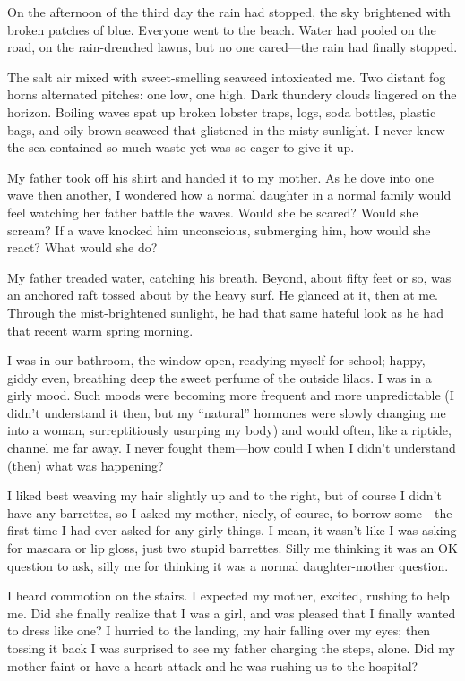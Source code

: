 On the afternoon of the third day the rain had stopped, the sky
brightened with broken patches of blue. Everyone went to the beach.
Water had pooled on the road, on the rain-drenched lawns, but no one
cared---the rain had finally stopped.

The salt air mixed with sweet-smelling seaweed intoxicated me. Two
distant fog horns alternated pitches: one low, one high. Dark thundery
clouds lingered on the horizon. Boiling waves spat up broken lobster
traps, logs, soda bottles, plastic bags, and oily-brown seaweed that
glistened in the misty sunlight. I never knew the sea contained so much
waste yet was so eager to give it up.

My father took off his shirt and handed it to my mother. As he dove into
one wave then another, I wondered how a normal daughter in a normal
family would feel watching her father battle the waves. Would she be
scared? Would she scream? If a wave knocked him unconscious, submerging
him, how would she react? What would she do?

My father treaded water, catching his breath. Beyond, about fifty feet
or so, was an anchored raft tossed about by the heavy surf. He glanced
at it, then at me. Through the mist-brightened sunlight, he had that
same hateful look as he had that recent warm spring morning.

I was in our bathroom, the window open, readying myself for school;
happy, giddy even, breathing deep the sweet perfume of the outside
lilacs. I was in a girly mood. Such moods were becoming more frequent
and more unpredictable (I didn't understand it then, but my ``natural''
hormones were slowly changing me into a woman, surreptitiously usurping
my body) and would often, like a riptide, channel me far away. I never
fought them---how could I when I didn't understand (then) what was
happening?

I liked best weaving my hair slightly up and to the right, but of course
I didn't have any barrettes, so I asked my mother, nicely, of course, to
borrow some---the first time I had ever asked for any girly things. I
mean, it wasn't like I was asking for mascara or lip gloss, just two
stupid barrettes. Silly me thinking it was an OK question to ask, silly
me for thinking it was a normal daughter-mother question.

I heard commotion on the stairs. I expected my mother, excited, rushing
to help me. Did she finally realize that I was a girl, and was pleased
that I finally wanted to dress like one? I hurried to the landing, my
hair falling over my eyes; then tossing it back I was surprised to see
my father charging the steps, alone. Did my mother faint or have a heart
attack and he was rushing us to the hospital?

